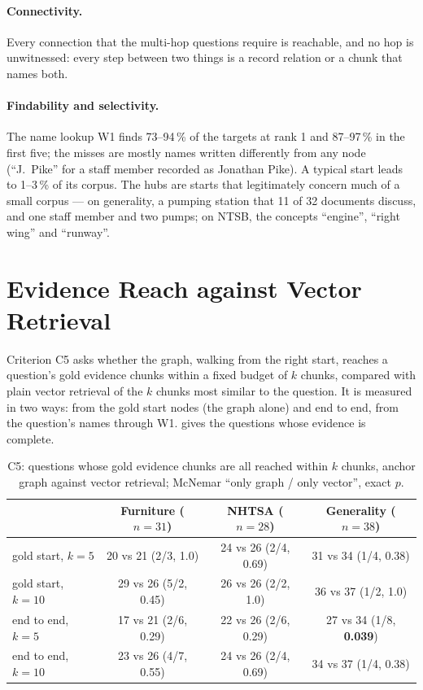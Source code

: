 \paragraph{Connectivity.} Every connection that the multi-hop questions require is reachable, and no hop is
unwitnessed: every step between two things is a record relation or a chunk that names both.

\paragraph{Findability and selectivity.} The name lookup W1 finds 73--94\,\% of the targets at rank 1 and 87--97\,\%
in the first five; the misses are mostly names written differently from any node (``J.~Pike'' for a staff
member recorded as Jonathan Pike). A typical start leads to 1--3\,\% of its corpus. The hubs are starts that
legitimately concern much of a small corpus --- on generality, a pumping station that 11 of 32 documents discuss,
and one staff member and two pumps; on NTSB, the concepts ``engine'', ``right wing'' and ``runway''.

\section{Evidence Reach against Vector Retrieval}\label{sec:ch05-reach}

Criterion C5 asks whether the graph, walking from the right start, reaches a question's gold evidence chunks
within a fixed budget of $k$ chunks, compared with plain vector retrieval of the $k$ chunks most similar to the
question. It is measured in two ways: from the gold start nodes (the graph alone) and end to end, from the
question's names through W1.  gives the questions whose evidence is complete.

\begin{table}[htbp]
\centering
\caption{C5: questions whose gold evidence chunks are all reached within $k$ chunks, anchor graph against vector
retrieval; McNemar ``only graph / only vector'', exact $p$.}
\label{tab:reach}
\small
\begin{tabular}{@{}lccc@{}}
\toprule
& Furniture ($n=31$) & NHTSA ($n=28$) & Generality ($n=38$) \\
\midrule
gold start, $k=5$ & 20 vs 21 (2/3, 1.0) & 24 vs 26 (2/4, 0.69) & 31 vs 34 (1/4, 0.38) \\
gold start, $k=10$ & 29 vs 26 (5/2, 0.45) & 26 vs 26 (2/2, 1.0) & 36 vs 37 (1/2, 1.0) \\
end to end, $k=5$ & 17 vs 21 (2/6, 0.29) & 22 vs 26 (2/6, 0.29) & 27 vs 34 (1/8, \textbf{0.039}) \\
end to end, $k=10$ & 23 vs 26 (4/7, 0.55) & 24 vs 26 (2/4, 0.69) & 34 vs 37 (1/4, 0.38) \\
\bottomrule
\end{tabular}
\end{table}

